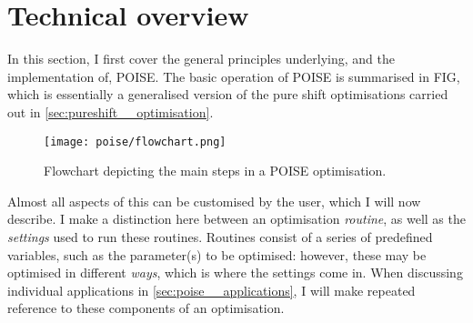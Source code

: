 \section{Technical overview}
\label{sec:poise__technical}

In this section, I first cover the general principles underlying, and the implementation of, POISE.
The basic operation of POISE is summarised in FIG, which is essentially a generalised version of the pure shift optimisations carried out in \cref{sec:pureshift__optimisation}.

\begin{figure}[htb]
    \centering
    \texttt{[image: poise/flowchart.png]}
    \caption[Flowchart for POISE optimisations]{Flowchart depicting the main steps in a POISE optimisation.}
    \label{fig:poise_flowchart}
\end{figure}

Almost all aspects of this can be customised by the user, which I will now describe.
I make a distinction here between an optimisation \textit{routine}, as well as the \textit{settings} used to run these routines.
Routines consist of a series of predefined variables, such as the parameter(s) to be optimised: however, these may be optimised in different \textit{ways}, which is where the settings come in.
When discussing individual applications in \cref{sec:poise__applications}, I will make repeated reference to these components of an optimisation.




